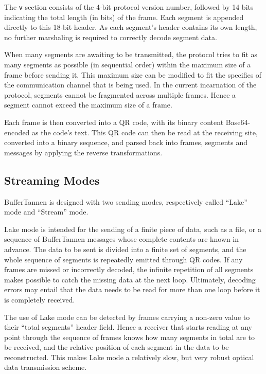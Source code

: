 The \verb+v+ section consists of the 4-bit protocol version number, followed by 14 bits indicating the total length (in bits) of the frame. Each segment is appended directly to this 18-bit header. As each segment's header contains its own length, no further marshaling is required to correctly decode segment data.

When many segments are awaiting to be transmitted, the protocol tries to fit as many segments as possible (in sequential order) within the maximum size of a frame before sending it. This maximum size can be modified to fit the specifics of the communication channel that is being used. In the current incarnation of the protocol, segments cannot be fragmented across multiple frames. Hence a segment cannot exceed the maximum size of a frame.

Each frame is then converted into a QR code, with its binary content Base64-encoded as the code's text. This QR code can then be read at the receiving site, converted into a binary sequence, and parsed back into frames, segments and messages by applying the reverse transformations.

\subsection{Streaming Modes}
\setcounter{paragraph}{0}

BufferTannen is designed with two sending modes, respectively called ``Lake'' mode and ``Stream'' mode.

Lake mode is intended for the sending of a finite piece of data, such as a file, or a sequence of BufferTannen messages whose complete contents are known in advance. The data to be sent is divided into a finite set of segments, and the whole sequence of segments is repeatedly emitted through QR codes. If any frames are missed or incorrectly decoded, the infinite repetition of all segments makes possible to catch the missing data at the next loop. Ultimately, decoding errors may entail that the data needs to be read for more than one loop before it is completely received.

The use of Lake mode can be detected by frames carrying a non-zero value to their ``total segments'' header field. Hence a receiver that starts reading at any point through the sequence of frames knows how many segments in total are to be received, and the relative position of each segment in the data to be reconstructed. This makes Lake mode a relatively slow, but very robust optical data transmission scheme.

